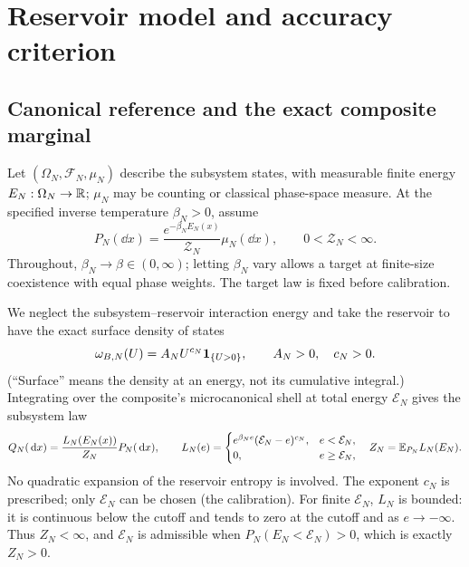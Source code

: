 \section{Reservoir model and accuracy criterion}
\label{sec:framework}

\subsection{Canonical reference and the exact composite marginal}

Let $(\Omega_N,\mathcal F_N,\mu_N)$ describe the subsystem states, with
measurable finite energy $E_N:\Omega_N\to\mathbb R$; $\mu_N$ may be counting
or classical phase-space measure. At the specified inverse temperature
$\beta_N>0$, assume
\begin{equation}
 P_N(\dd x)=\frac{e^{-\beta_NE_N(x)}}{\mathcal Z_N}\mu_N(\dd x),
 \qquad 0<\mathcal Z_N<\infty.
 \label{eq:canonical}
\end{equation}
Throughout, $\beta_N\to\beta\in(0,\infty)$; letting $\beta_N$ vary
allows a target at finite-size coexistence with equal phase weights.
The target law is fixed before calibration.

We neglect the subsystem--reservoir interaction energy and take the
reservoir to have the exact surface density of states
\begin{equation}
 \omega_{B,N}(U)=A_N U^{c_N}\mathbf 1_{\{U>0\}},
 \qquad A_N>0,\quad c_N>0.
 \label{eq:bath-dos}
\end{equation}
(``Surface'' means the density at an energy, not its cumulative
integral.) Integrating over the composite's microcanonical shell at
total energy $\mathcal E_N$ gives the subsystem law
\begin{equation}
 Q_N(\,\mathrm d x)=\frac{L_N(E_N(x))}{Z_N}P_N(\,\mathrm d x),\qquad
 L_N(e)=
 \begin{cases}
 e^{\beta_N e}(\mathcal E_N-e)^{c_N},&e<\mathcal E_N,\\
 0,&e\ge\mathcal E_N,
 \end{cases}
 \quad Z_N=\mathbb E_{P_N}L_N(E_N).
 \label{eq:exact-marginal}
\end{equation}
No quadratic expansion of the reservoir entropy is involved. The
exponent $c_N$ is prescribed; only $\mathcal E_N$ can be chosen (the
calibration). For finite $\mathcal E_N$, $L_N$ is bounded: it is
continuous below the cutoff and tends to zero at the cutoff and as
$e\to-\infty$. Thus $Z_N<\infty$, and $\mathcal E_N$ is admissible
when $P_N(E_N<\mathcal E_N)>0$, which is exactly $Z_N>0$.

